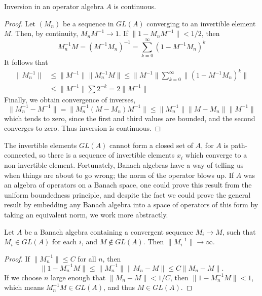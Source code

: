 \begin{lemma}
    Inversion in an operator algebra $A$ is continuous.
\end{lemma}
\begin{proof}
    Let $(M_n)$ be a sequence in $GL(A)$ converging to an invertible element $M$. Then, by continuity, $M_nM^{-1} \to 1$. If $\| 1 - M_n M^{-1} \| < 1/2$, then
    \[ M_n^{-1} M = (M^{-1}M_n)^{-1} = \sum_{k = 0}^\infty (1 - M^{-1}M_n)^k \]
    It follows that
    \begin{align*}
        \| M_n^{-1} \| &\leq \| M^{-1} \| \| M_n^{-1} M \| \leq \| M^{-1} \| \sum_{k = 0}^\infty \| (1 - M^{-1} M_n)^k \|\\
        &\leq \| M^{-1} \| \sum 2^{-k} = 2 \| M^{-1} \|
    \end{align*}
    Finally, we obtain convergence of inverses,
    \[ \| M_n^{-1} - M^{-1} \| = \| M_n^{-1} (M - M_n) M^{-1} \| \leq \| M_n^{-1} \| \| M - M_n \| \| M^{-1} \| \]
    which tends to zero, since the first and third values are bounded, and the second converges to zero. Thus inversion is continuous.
\end{proof}

The invertible elements $GL(A)$ cannot form a closed set of $A$, for $A$ is path-connected, so there is a sequence of invertible elements $x_i$ which converge to a non-invertible element. Fortunately, Banach algebras have a way of telling us when things are about to go wrong; the norm of the operator blows up. If $A$ was an algebra of operators on a Banach space, one could prove this result from the uniform boundedness principle, and despite the fact we could prove the general result by embedding any Banach algebra into a space of operators of this form by taking an equivalent norm, we work more abstractly.

\begin{lemma}
    Let $A$ be a Banach algebra containing a convergent sequence $M_i \to M$, such that $M_i \in GL(A)$ for each $i$, and $M \not \in GL(A)$. Then $\| M_i^{-1} \| \to \infty$.
\end{lemma}
\begin{proof}
    If $\| M_n^{-1} \| \leq C$ for all $n$, then
    \[ \| 1 - M_n^{-1} M \| \leq \| M_n^{-1} \| \| M_n - M \| \leq C \| M_n - M \|. \]
    If we choose $n$ large enough that $\| M_n - M \| < 1/C$, then $\| 1 - M_n^{-1} M \| < 1$, which means $M_n^{-1} M \in GL(A)$, and thus $M \in GL(A)$.
\end{proof}

